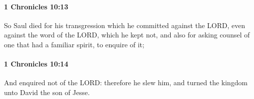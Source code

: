 		\paragraph{1 Chronicles 10:13} %
			\label{1CHRONICLES-10-13}

			So Saul died for his transgression which he committed against the LORD, even against the word of the LORD, which he kept not, and also for asking counsel of one that had a familiar spirit, to enquire of it;


		\paragraph{1 Chronicles 10:14} %
			\label{1CHRONICLES-10-14}

			And enquired not of the LORD: therefore he slew him, and turned the kingdom unto David the son of Jesse.

